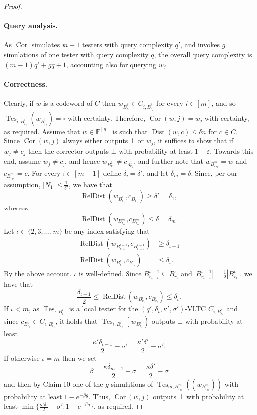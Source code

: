 \begin{proof}
\paragraph{Query analysis.} As $\operatorname{Cor}$ simulates $m-1$ testers with query complexity $q'$, and invokes $g$ simulations of one tester with query complexity $q$, the overall query complexity is $(m-1)q'+gq+1$, accounting also for querying $w_j$.
\paragraph{Correctness.} Clearly, if $w$ is a codeword of $C$ then $w_{B_{r_i}^i}\in C_{i,B_{r_i}^i}$ for every $i\in[m]$, and so $\operatorname{Tes}_{i,B_{r_i}^i}(w_{B_{r_i}^i})=\circ$ with certainty. Therefore, $\operatorname{Cor}(w,j)=w_j$ with certainty, as required.
Assume that $w\in\mathbb F^{[n]}$ is such that $\operatorname{Dist}(w,c)\le\delta n$ for $c\in C$. Since $\operatorname{Cor}(w,j)$ always either outputs $\bot$ or $w_j$, it suffices to show that if $w_j\ne c_j$ then the corrector outputs $\bot$ with probability at least $1-\varepsilon$. Towards this end, assume $w_j\ne c_j$, and hence $w_{B_{r_1}^1}\ne c_{B_{r_1}^1}$, and further note that $w_{B_{r_m}^m}=w$ and $c_{B_{r_m}^m}=c$. For every $i\in[m-1]$ define $\delta_i=\delta'$, and let $\delta_m=\delta$. Since, per our assumption, $|N_1|\le\frac1{\delta'}$, we have that
\[\operatorname{RelDist}(w_{B_{r_1}^1},c_{B_{r_1}^1})\ge\delta'=\delta_1,\]
whereas
\[\operatorname{RelDist}(w_{B_{r_m}^m},c_{B_{r_m}^m})\le\delta=\delta_m.\]
Let $\iota\in\{2,3,\ldots,m\}$ be any index satisfying that
\begin{align*}\operatorname{RelDist}(w_{B_{r_{\iota-1}}^{\iota-1}},c_{B_{r_{\iota-1}}^{\iota-1}})&\ge\delta_{\iota-1}\\\operatorname{RelDist}(w_{B_{r_\iota}^\iota},c_{B_{r_\iota}^\iota})&\le\delta_\iota.\end{align*}
By the above account, $\iota$ is well-defined. Since $B_{r_{\iota-1}}^{\iota-1}\subseteq B_{r_\iota}^\iota$ and $|B_{r_{\iota-1}}^{\iota-1}|=\frac12|B_{r_\iota}^\iota|$, we have that
\[\frac{\delta_{\iota-1}}2\le\operatorname{RelDist}(w_{B_{r_\iota}^\iota},c_{B_{r_\iota}^\iota})\le\delta_\iota.\]
If $\iota<m$, as $\operatorname{Tes}_{\iota,B_{r_\iota}^\iota}$ is a local tester for the $(q',\delta_\iota,\kappa',\sigma')$-VLTC $C_{i,B_{r_\iota}^\iota}$ and since $c_{B_{r_\iota}^\iota}\in C_{\iota,B_{r_\iota}^\iota}$, it holds that $\operatorname{Tes}_{\iota,B_{r_\iota}^\iota}(w_{B_{r_\iota}^\iota})$ outputs $\bot$ with probability at least
\[\frac{\kappa'\delta_{\iota-1}}2-\sigma'=\frac{\kappa'\delta'}2-\sigma'.\]
If otherwise $\iota=m$ then we set
\[\beta=\frac{\kappa\delta_{m-1}}2-\sigma=\frac{\kappa\delta'}2-\sigma\]
and then by Claim 10 one of the $g$ simulations of $\operatorname{Tes}_{m,B_{r_m}^m}((w_{B_{r_m}^m}))$ with probability at least $1-e^{-\beta g}$. Thus, $\operatorname{Cor}(w,j)$ outputs $\bot$ with probability at least $\min\{\frac{\kappa'\delta'}2-\sigma',1-e^{-\beta g}\}$, as required.
\end{proof}
